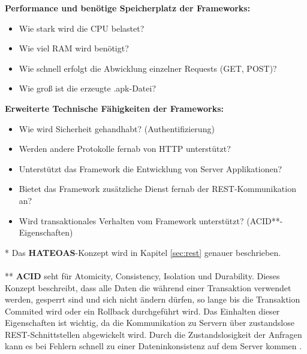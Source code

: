 \textbf{Performance und benötige Speicherplatz der Frameworks:}
\begin{itemize}
	\item Wie stark wird die CPU belastet?  
	\item Wie viel RAM wird benötigt? 
	\item Wie schnell erfolgt die Abwicklung einzelner Requests (GET, POST)?
	\item Wie groß ist die erzeugte .apk-Datei?	
\end{itemize}
\newpage
\textbf{Erweiterte Technische Fähigkeiten der Frameworks:}
\begin{itemize}
	\item Wie wird Sicherheit gehandhabt?  (Authentifizierung)
	\item Werden andere Protokolle fernab von HTTP unterstützt?	
	\item Unterstützt das Framework die Entwicklung von Server Applikationen?
	\item Bietet das Framework zusätzliche Dienst fernab der REST-Kommunikation an?
	\item Wird transaktionales Verhalten vom Framework unterstützt? (ACID**-Eigenschaften)\\
\end{itemize}

* Das \textbf{HATEOAS}-Konzept wird in Kapitel \ref{sec:rest} genauer beschrieben.
\\\\
** \textbf{ACID} seht für Atomicity, Consistency, Isolation und Durability. Dieses Konzept beschreibt, dass alle Daten die während einer Transaktion verwendet werden, gesperrt sind und sich nicht ändern dürfen, so lange bis die Transaktion Commited wird oder ein Rollback durchgeführt wird. Das Einhalten dieser Eigenschaften ist wichtig, da die Kommunikation zu Servern über zustandslose REST-Schnittstellen abgewickelt wird. Durch die Zustandslosigkeit der Anfragen kann es bei Fehlern schnell zu einer Dateninkonsistenz auf dem Server kommen \cite{braun:Transaktionen}.
